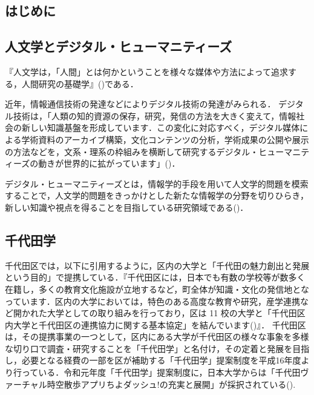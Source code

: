 \documentclass[a4paper, twoside]{jarticle}
\begin{document}
\maketitle %
\begin{multicols}{2} %
\setcounter{page}{1} %

\section{はじめに}

\subsection{人文学とデジタル・ヒューマニティーズ}
『人文学は，「人間」とは何かということを様々な媒体や方法によって追求する，人間研究の基礎学』(\cite{huma})である．\par
近年，情報通信技術の発達などによりデジタル技術の発達がみられる．
デジタル技術は，「人類の知的資源の保存，研究，発信の方法を大きく変えて，情報社会の新しい知識基盤を形成しています．この変化に対応すべく，デジタル媒体による学術資料のアーカイブ構築，文化コンテンツの分析，学術成果の公開や展示の方法などを，文系・理系の枠組みを横断して研究するデジタル・ヒューマニティーズの動きが世界的に拡がっています」(\cite{digihumu1})．\par

デジタル・ヒューマニティーズとは，情報学的手段を用いて人文学的問題を模索することで，人文学的問題をきっかけとした新たな情報学の分野を切りひらき，新しい知識や視点を得ることを目指している研究領域である(\cite{digihumu2})．

\subsection{千代田学}
千代田区では，以下に引用するように，区内の大学と「千代田の魅力創出と発展という目的」で提携している．『千代田区には，日本でも有数の学校等が数多く在籍し，多くの教育文化施設が立地するなど，町全体が知識・文化の発信地となっています．区内の大学においては，特色のある高度な教育や研究，産学連携など開かれた大学としての取り組みを行っており，区は 11 校の大学と「千代田区内大学と千代田区の連携協力に関する基本協定」を結んでいます(\cite{digi4})』．
千代田区は，その提携事業の一つとして，区内にある大学が千代田区の様々な事象を多様な切り口で調査・研究することを「千代田学」と名付け，その定着と発展を目指し，必要となる経費の一部を区が補助する「千代田学」提案制度を平成16年度より行っている．令和元年度「千代田学」提案制度に，日本大学からは「千代田ヴァーチャル時空散歩アプリちよダッシュ!の充実と展開」が採択されている(\cite{digi5}).


\end{multicols}
\end{document}
